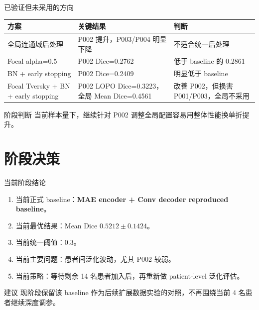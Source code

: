 \documentclass[
  presentation,
  titlegraphic=./images/bit_logo.pdf,
  framelogo=./images/bit_logo.pdf
]{bitbeamer}
\begin{document}
\begin{frame}[t]{已验证但未采用的方向}
  \begin{table}
    \centering
    \scriptsize
    \begin{tabular}{p{3.3cm}p{3.2cm}p{5.3cm}}
      \toprule
      方案 & 关键结果 & 判断 \\
      \midrule
      全局连通域后处理 & P002 提升，P003/P004 明显下降 & 不适合统一后处理 \\
      Focal alpha=0.5 & P002 Dice=0.2762 & 低于 baseline 的 0.2861 \\
      BN + early stopping & P002 Dice=0.2409 & 明显低于 baseline \\
      Focal Tversky + BN + early stopping & P002 LOPO Dice=0.3223，全局 Mean Dice=0.4561 & 改善 P002，但损害 P001/P003，全局不采用 \\
      \bottomrule
    \end{tabular}
  \end{table}

  \vspace{0.35cm}

  \begin{block}{阶段判断}
    当前样本量下，继续针对 P002 调整全局配置容易用整体性能换单折提升。
  \end{block}
\end{frame}

\section{阶段决策}

\begin{frame}[t]{当前阶段结论}
  \begin{enumerate}
    \item 当前正式 baseline：\textbf{MAE encoder + Conv decoder reproduced baseline}。
    \item 当前最优结果：Mean Dice $0.5212 \pm 0.1424$。
    \item 当前统一阈值：0.3。
    \item 当前主要问题：患者间泛化波动，尤其 P002 较弱。
    \item 当前策略：等待剩余 14 名患者加入后，再重新做 patient-level 泛化评估。
  \end{enumerate}

  \vspace{0.4cm}

  \begin{block}{建议}
    现阶段保留该 baseline 作为后续扩展数据实验的对照，不再围绕当前 4 名患者继续深度调参。
  \end{block}
\end{frame}
\end{document}
